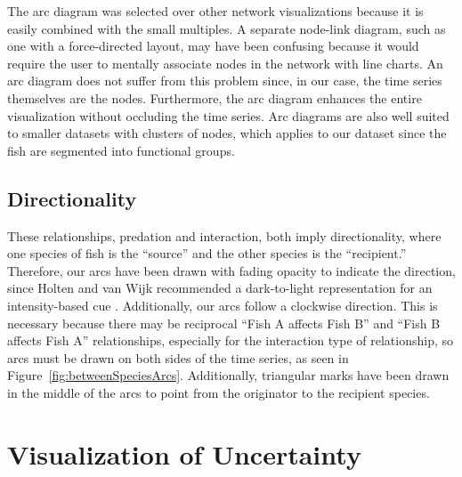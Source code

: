 The arc diagram was selected over other network visualizations because it is easily combined with the small multiples.  A separate node-link diagram, such as one with a force-directed layout, may have been confusing because it would require the user to mentally associate nodes in the network with line charts.  An arc diagram does not suffer from this problem since, in our case, the time series themselves are the nodes.  Furthermore, the arc diagram enhances the entire visualization without occluding the time series.  Arc diagrams are also well suited to smaller datasets with clusters of nodes, which applies to our dataset since the fish are segmented into functional groups.

\subsection{Directionality}

These relationships, predation and interaction, both imply directionality, where one species of fish is the ``source'' and the other species is the ``recipient.''  Therefore, our arcs have been drawn with fading opacity to indicate the direction, since Holten and van Wijk recommended a dark-to-light representation for an intensity-based cue \cite{holten2009}.  Additionally, our arcs follow a clockwise direction.  This is necessary because there may be reciprocal ``Fish A affects Fish B'' and ``Fish B affects Fish A'' relationships, especially for the interaction type of relationship, so arcs must be drawn on both sides of the time series, as seen in Figure~\ref{fig:betweenSpeciesArcs}.  Additionally, triangular marks have been drawn in the middle of the arcs to point from the originator to the recipient species.

\section{Visualization of Uncertainty}


